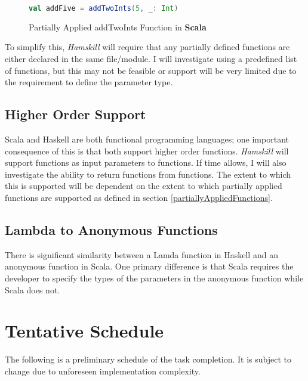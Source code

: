 \documentclass{report}
\begin{document}
\begin{figure}[H]\label{fig:addFiveScala}
\begin{mdframed}
\begin{lstlisting}[language=Scala]
val addFive = addTwoInts(5, _: Int)
\end{lstlisting}
\end{mdframed}
\caption{Partially Applied addTwoInts Function in \textbf{Scala}}
\end{figure}

To simplify this, \emph{Hamskill} will require that any partially defined functions are either declared in the same file/module.  I will investigate using a predefined list of functions, but this may not be feasible or support will be very limited due to the requirement to define the parameter type.

\subsection{Higher Order Support}

Scala and Haskell are both functional programming languages; one important consequence of this is that both support higher order functions.  \emph{Hamskill} will support functions as input parameters to functions.  If time allows, I will also investigate the ability to return functions from functions.  The extent to which this is supported will be dependent on the extent to which partially applied functions are supported as defined in section \ref{partiallyAppliedFunctions}.

\subsection{Lambda to Anonymous Functions}

There is significant similarity between a Lamda function in Haskell and an anonymous function in Scala.  One primary difference is that Scala requires the developer to specify the types of the parameters in the anonymous function while Scala does not.  

\section{Tentative Schedule}

The following is a preliminary schedule of the task completion.  It is subject to change due to unforeseen implementation complexity.
\end{document}
